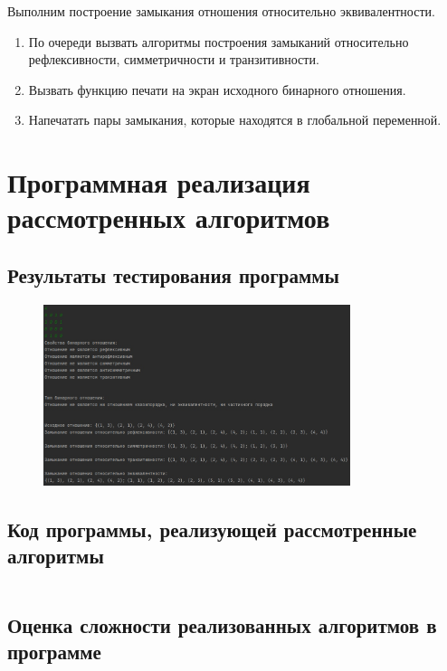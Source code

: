 \documentclass[bachelor, och, labwork]{shiza}
\begin{document}
Выполним построение замыкания отношения относительно эквивалентности.

\begin{enumerate}
    \item По очереди вызвать алгоритмы построения замыканий относительно рефлексивности,
    симметричности и транзитивности.
    \item Вызвать функцию печати на экран исходного бинарного отношения.
    \item Напечатать пары замыкания, которые находятся в глобальной переменной.
\end{enumerate}


\section{Программная реализация рассмотренных алгоритмов}
    
    \subsection{Результаты тестирования программы}

        \begin{figure}[H]
            \centering
            \includegraphics[width=0.8\textwidth]{pic/1.jpg}
            \caption{}
        \end{figure}
    
    \subsection{Код программы, реализующей рассмотренные алгоритмы}
    
        \inputminted[linenos,breaklines=true, fontsize=\small, style=bw]{python}{code/lab1.py}

    
    \subsection{Оценка сложности реализованных алгоритмов в программе}
    
\end{document}
